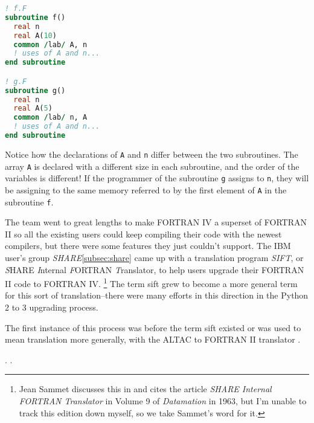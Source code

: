 \begin{lstlisting}[language=fortran,frame=single]
! f.F
subroutine f()
  real n
  real A(10)
  common /lab/ A, n
  ! uses of A and n...
end subroutine

! g.F
subroutine g()
  real n
  real A(5)
  common /lab/ n, A
  ! uses of A and n...
end subroutine
\end{lstlisting}

Notice how the declarations of \texttt{A} and \texttt{n} differ between the two
subroutines. The array \texttt{A} is declared with a different size in each subroutine,
and the order of the variables is different!
If the programmer of the subroutine \texttt{g} assigns to \texttt{n}, they
will be assigning to the same memory referred to by the first element of \texttt{A}
in the subroutine \texttt{f}.

The team went to great lengths to make FORTRAN IV a superset of FORTRAN II
so all the existing users could keep compiling their code with the newest
compilers, but there were some features they just couldn't support.
The IBM user's group \textit{SHARE}\cref{subsec:share} came up with a
translation program \textit{SIFT}, or
\textit{S}HARE \textit{I}nternal \textit{F}ORTRAN \textit{T}ranslator,
to help users upgrade their FORTRAN II code to FORTRAN IV.
\footnote{
	Jean Sammet discusses this in 
	and cites the article \textit{SHARE Internal FORTRAN Translator} in
	Volume 9 of \textit{Datamation} in 1963, but I'm unable to track this
	edition down myself, so we take Sammet's word for it.}
The term \gls{sift} grew to become a more general term for this sort of
translation--there were many efforts in this direction in the Python 2 to
3 upgrading process.

The first instance of this process was before the term \gls{sift}
existed or was used to mean translation more generally, with
the ALTAC to FORTRAN II translator \cite{olsen_altac_fortranii_translator_1965}.

.
\cite{backus_heising_fortran_1964}.
